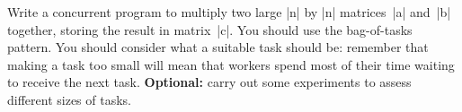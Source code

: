 \begin{question}
Write a concurrent program to multiply two large |n| by |n|
matrices~|a| and~|b| together, storing the result in matrix~|c|.  You should
use the bag-of-tasks pattern.  You should consider what a suitable task
should be: remember that making a task too small will mean that workers spend
most of their time waiting to receive the next task.  \textbf{Optional:} carry
out some experiments to assess different sizes of tasks.
\end{question}


